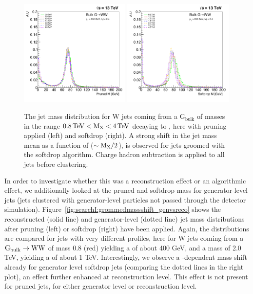 \begin{figure}[h!]
\centering
\includegraphics[width=0.49\textwidth]{figures/analysis/search1/misc/pruned_mass_shift.pdf}
\includegraphics[width=0.49\textwidth]{figures/analysis/search1/misc/softdrop_mass_shift.pdf}
\caption{The jet mass distribution for W jets coming from a $\textrm{G}_{\textrm{bulk}}$ of masses in the range $0.8 \,\text{Te\hspace{-.08em}V} < \text{M}_{\text{X}} < 4 \,\text{Te\hspace{-.08em}V}$ decaying to \WW, here with pruning applied (left) and softdrop (right). A strong shift in the jet mass mean as a function of \PT ($\sim\text{M}_{\text{X}}/2$), is observed for jets groomed with the softdrop algorithm. Charge hadron subtraction is applied to all jets before clustering.}
\label{fig:searchI:grommedmassshift}
\end{figure}
In order to investigate whether this was a reconstruction effect or an algorithmic effect, we additionally looked at the pruned and softdrop mass for generator-level jets (jets clustered with generator-level particles not passed through the detector simulation). Figure~\ref{fig:searchI:grommedmassshift_genvsreco} shows the reconstructed (solid line) and generator-level (dotted line) jet mass distributions after pruning (left) or softdrop (right) have been applied. Again, the distributions are compared for jets with very different \PT profiles, here for W jets coming from a $\mathrm{G}_\mathrm{bulk} \rightarrow \mathrm{W}\mathrm{W}$ of mass 0.8 \TeV (red) yielding a \PT of about 400 GeV, and a mass of 2.0 TeV, yielding a \PT of about 1 TeV. Interestingly, we observe a \PT-dependent mass shift already for generator level softdrop jets (comparing the dotted lines in the right plot), an effect further enhanced at reconstruction level. This effect is not present for pruned jets, for either generator level or reconstruction level.
